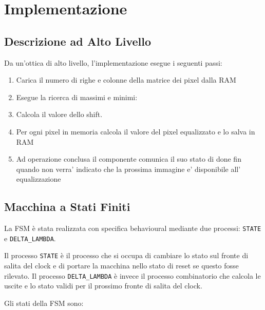 \documentclass{article}
\begin{document}
\section{Implementazione}

\subsection{Descrizione ad Alto Livello}
\label{alto_livello}

Da un'ottica di alto livello, l'implementazione esegue i seguenti passi:

\begin{enumerate}
\item Carica il numero di righe e colonne della matrice dei pixel dalla RAM
\item Esegue la ricerca di massimi e minimi:
\item Calcola il valore dello shift.
\item Per ogni pixel in memoria calcola il valore del pixel equalizzato e lo salva in RAM
\item Ad operazione conclusa il componente comunica il suo stato di done fin quando non verra' indicato che la prossima immagine e' disponibile all' equalizzazione
\end{enumerate}

\subsection{Macchina a Stati Finiti}
\label{FSM}

La FSM è stata realizzata con specifica behavioural mediante due processi: \texttt{STATE} e \texttt{DELTA\_LAMBDA}.

Il processo \texttt{STATE} è il processo che si occupa di cambiare lo stato sul fronte di salita del clock e di portare la macchina nello stato di reset se questo fosse rilevato.
Il processo \texttt{DELTA\_LAMBDA} è invece il processo combinatorio che calcola le uscite e lo stato validi per il prossimo fronte di salita del clock.

Gli stati della FSM sono:
\end{document}

